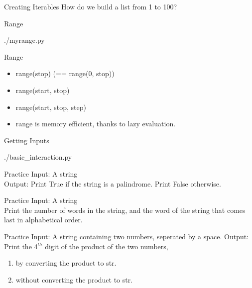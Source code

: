 \documentclass{beamer}
\begin{document}
\begin{frame}{Creating Iterables}
  How do we build a list from 1 to 100?
\end{frame}

\begin{frame}{Range}
  \begin{lstinputlisting}
    {./myrange.py}
  \end{lstinputlisting}
\end{frame}

\begin{frame}{Range}
  \begin{itemize}
    \item range(stop) (== range(0, stop))
    \item range(start, stop)
    \item range(start, stop, step)
    \item range is memory efficient, thanks to lazy evaluation.
  \end{itemize}
\end{frame}

\begin{frame}{Getting Inputs}
  \begin{lstinputlisting}
    {./basic_interaction.py}
  \end{lstinputlisting}
\end{frame}

\begin{frame}{Practice}
  Input: A string\\
  Output: Print True if the string is a palindrome. Print False otherwise.
\end{frame}

\begin{frame}{Practice}
  Input: A string\\
  Print the number of words in the string, and the word of the string that comes last in
  alphabetical order.
\end{frame}

\begin{frame}{Practice}
  Input: A string containing two numbers, seperated by a space.
  Output: Print the 4$^{th}$ digit of the product of the two numbers,
  \begin{enumerate}
    \item by converting the product to str.
    \item without converting the product to str.
  \end{enumerate}
\end{frame}
\end{document}
